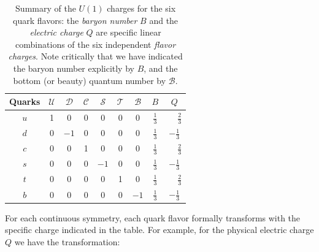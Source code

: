 \begin{table}[H]
    \begin{center}
        \renewcommand{\arraystretch}{1.5}
        \begin{tabular}{|c|c|c|c|c|c|c||c|c|}
            \hline
            Quarks & \(\mathcal{U}\) & \(\mathcal{D}\) & \(\mathcal{C}\) & \(\mathcal{S}\) & \(\mathcal{T}\) & \(\mathcal{B}\) & \(B\)           & \(Q\)                      \\
            \hline\hline
            \(u\)  & 1               & 0               & 0               & 0               & 0               & 0               & \(\frac{1}{3}\) & \(\phantom{-}\frac{2}{3}\) \\ \hline
            \(d\)  & 0               & \(-1\)          & 0               & 0               & 0               & 0               & \(\frac{1}{3}\) & \(-\frac{1}{3}\)           \\ \hline\hline
            \(c\)  & 0               & 0               & 1               & 0               & 0               & 0               & \(\frac{1}{3}\) & \(\phantom{-}\frac{2}{3}\) \\ \hline
            \(s\)  & 0               & 0               & 0               & \(-1\)          & 0               & 0               & \(\frac{1}{3}\) & \(-\frac{1}{3}\)           \\ \hline\hline
            \(t\)  & 0               & 0               & 0               & 0               & 1               & 0               & \(\frac{1}{3}\) & \(\phantom{-}\frac{2}{3}\) \\ \hline
            \(b\)  & 0               & 0               & 0               & 0               & 0               & \(-1\)          & \(\frac{1}{3}\) & \(-\frac{1}{3}\)           \\ \hline
        \end{tabular}
        \caption{Summary of the \(U(1)\) charges for the six quark flavors: the \textit{baryon number} \(B\) and the \textit{electric charge} \(Q\) are specific linear combinations of the six independent \textit{flavor charges}. Note critically that we have indicated the baryon number explicitly by \(B\), and the bottom (or beauty) quantum number by \(\mathcal{B}\).}
        \label{tab:flavor_charges}
    \end{center}
\end{table}
For each continuous symmetry, each quark flavor formally transforms with the specific charge indicated in the table. For example, for the physical electric charge \(Q\) we have the transformation:
